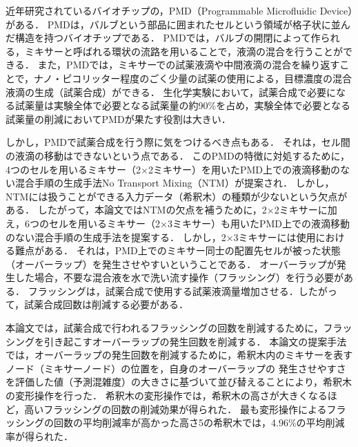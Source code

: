 近年研究されているバイオチップの，PMD（Programmable Microfluidic Device）がある．
PMDは，バルブという部品に囲まれたセルという領域が格子状に並んだ構造を持つバイオチップである．
PMDでは，バルブの開閉によって作られる，ミキサーと呼ばれる環状の流路を用いることで，液滴の混合を行うことができる．
また，PMDでは，ミキサーでの試薬液滴や中間液滴の混合を繰り返すことで，ナノ・ピコリッター程度のごく少量の試薬の使用による，目標濃度の混合液滴の生成（試薬合成）ができる．
生化学実験において，試薬合成で必要になる試薬量は実験全体で必要となる試薬量の約90\%を占め，実験全体で必要となる試薬量の削減においてPMDが果たす役割は大きい．

しかし，PMDで試薬合成を行う際に気をつけるべき点もある．
それは，セル間の液滴の移動はできないという点である．
このPMDの特徴に対処するために，4つのセルを用いるミキサー（2$\times$2ミキサー）を用いたPMD上での液滴移動のない混合手順の生成手法No Transport Mixing（NTM）が提案され．
しかし，NTMには扱うことができる入力データ（希釈木）の種類が少ないという欠点がある．
したがって，本論文ではNTMの欠点を補うために，2$\times$2ミキサーに加え，6つのセルを用いるミキサー（2$\times$3ミキサー）も用いたPMD上での液滴移動のない混合手順の生成手法を提案する．
しかし，2$\times$3ミキサーには使用における難点がある．
それは，PMD上でのミキサー同士の配置先セルが被った状態（オーバーラップ）を発生させやすいということである．
オーバーラップが発生した場合，不要な混合液を水で洗い流す操作（フラッシング）を行う必要がある．
フラッシングは，試薬合成で使用する試薬液滴量増加させる．したがって，試薬合成回数は削減する必要がある．

本論文では，試薬合成で行われるフラッシングの回数を削減するために，フラッシングを引き起こすオーバーラップの発生回数を削減する．
本論文の提案手法では，オーバーラップの発生回数を削減するために，希釈木内のミキサーを表すノード（ミキサーノード）の位置を，自身のオーバーラップの
発生させやすさを評価した値（予測混雑度）の大きさに基づいて並び替えることにより，希釈木の変形操作を行った．
希釈木の変形操作では，希釈木の高さが大きくなるほど，高いフラッシングの回数の削減効果が得られた．
最も変形操作によるフラッシングの回数の平均削減率が高かった高さ5の希釈木では，4.96\%の平均削減率が得られた．
